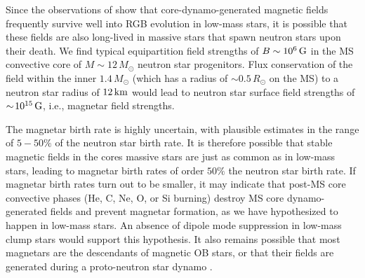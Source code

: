 Since the observations of \cite{Stello_2016} show that core-dynamo-generated magnetic fields frequently survive well into RGB evolution in low-mass stars, it is possible that these fields are also long-lived in massive stars that spawn neutron stars upon their death. We find typical equipartition field strengths of $B \sim 10^6 \, {\rm G}$ in the MS convective core of $M \sim 12 \, M_\odot$ neutron star progenitors. Flux conservation of the field within the inner $1.4 \, M_\odot$ (which has a radius of $\sim \! 0.5 \, R_\odot$ on the MS) to a neutron star radius of $12 \, {\rm km}$ would lead to neutron star surface field strengths of $\sim \! 10^{15} \, {\rm G}$, i.e., magnetar field strengths.  

The magnetar birth rate is highly uncertain, with plausible estimates in the range of \citep{keane_1998,mereghetti_2015} $5-50\%$ of the neutron star birth rate. It is therefore possible that stable magnetic fields in the cores massive stars are just as common as in low-mass stars, leading to magnetar birth rates of order $50 \%$ the neutron star birth rate.  
If magnetar birth rates turn out to be smaller, it may indicate that post-MS core convective phases (He, C, Ne, O, or Si burning) destroy MS core dynamo-generated fields and prevent magnetar formation, as we have hypothesized to happen in low-mass stars. 
An absence of dipole mode suppression in low-mass clump stars would support this hypothesis. It also remains possible that most magnetars are the descendants of magnetic OB stars, or that their fields are generated during a proto-neutron star dynamo \cite{1992ApJ...392L...9D}.



  
  
  
  
  
  
  
  
  
  
  